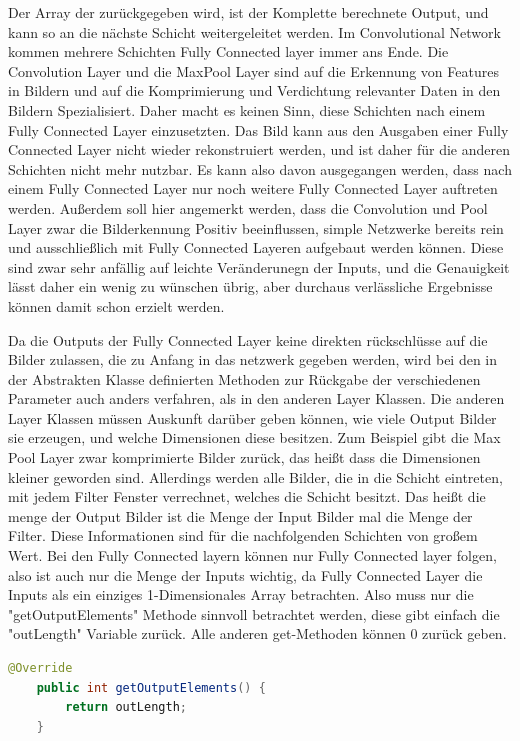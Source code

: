 \documentclass[12pt]{article}
\begin{document}
Der Array der zurückgegeben wird, ist der Komplette berechnete Output, und kann so an die nächste Schicht weitergeleitet werden. Im Convolutional Network kommen mehrere Schichten Fully Connected layer immer ans Ende. Die Convolution Layer und die MaxPool Layer sind auf die Erkennung von Features in Bildern und auf die Komprimierung und Verdichtung relevanter Daten in den Bildern Spezialisiert. Daher macht es keinen Sinn, diese Schichten nach einem Fully Connected Layer einzusetzten. Das Bild kann aus den Ausgaben einer Fully Connected Layer nicht wieder rekonstruiert werden, und ist daher für die anderen Schichten nicht mehr nutzbar. Es kann also davon ausgegangen werden, dass nach einem Fully Connected Layer nur noch weitere Fully Connected Layer auftreten werden. 
Außerdem soll hier angemerkt werden, dass die Convolution und Pool Layer zwar die Bilderkennung Positiv beeinflussen, simple Netzwerke bereits rein und ausschließlich mit Fully Connected Layeren aufgebaut werden können. Diese sind zwar sehr anfällig auf leichte Veränderunegn der Inputs, und die Genauigkeit lässt daher ein wenig zu wünschen übrig, aber durchaus verlässliche Ergebnisse können damit schon erzielt werden.

Da die Outputs der Fully Connected Layer keine direkten rückschlüsse auf die Bilder zulassen, die zu Anfang in das netzwerk gegeben werden, wird bei den in der Abstrakten Klasse definierten Methoden zur Rückgabe der verschiedenen Parameter auch anders verfahren, als in den anderen Layer Klassen. Die anderen Layer Klassen müssen Auskunft darüber geben können, wie viele Output Bilder sie erzeugen, und welche Dimensionen diese besitzen. Zum Beispiel gibt die Max Pool Layer zwar komprimierte Bilder zurück, das heißt dass die Dimensionen kleiner geworden sind. Allerdings werden alle Bilder, die in die Schicht eintreten, mit jedem Filter Fenster verrechnet, welches die Schicht besitzt. Das heißt die menge der Output Bilder ist die Menge der Input Bilder mal die Menge der Filter. Diese Informationen sind für die nachfolgenden Schichten von großem Wert. Bei den Fully Connected layern können nur Fully Connected layer folgen, also ist auch nur die Menge der Inputs wichtig, da Fully Connected Layer die Inputs als ein einziges 1-Dimensionales Array betrachten. Also muss nur die "getOutputElements" Methode sinnvoll betrachtet werden, diese gibt einfach die "outLength" Variable zurück. Alle anderen get-Methoden können 0 zurück geben.

\begin{lstlisting}[language=Java] 
    @Override
    public int getOutputElements() {
        return outLength;
    }
\end{lstlisting} 
\end{document}
